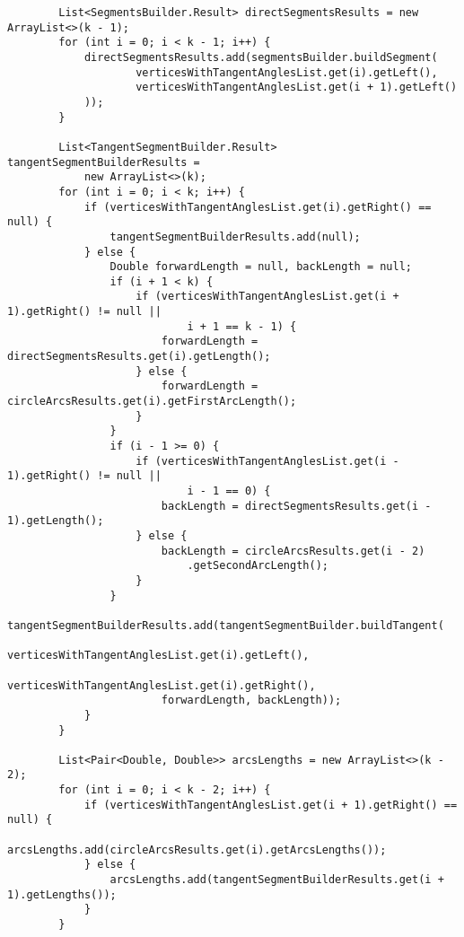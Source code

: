\begin{verbatim}
        List<SegmentsBuilder.Result> directSegmentsResults = new ArrayList<>(k - 1);
        for (int i = 0; i < k - 1; i++) {
            directSegmentsResults.add(segmentsBuilder.buildSegment(
                    verticesWithTangentAnglesList.get(i).getLeft(),
                    verticesWithTangentAnglesList.get(i + 1).getLeft()
            ));
        }

        List<TangentSegmentBuilder.Result> tangentSegmentBuilderResults =
            new ArrayList<>(k);
        for (int i = 0; i < k; i++) {
            if (verticesWithTangentAnglesList.get(i).getRight() == null) {
                tangentSegmentBuilderResults.add(null);
            } else {
                Double forwardLength = null, backLength = null;
                if (i + 1 < k) {
                    if (verticesWithTangentAnglesList.get(i + 1).getRight() != null ||
                            i + 1 == k - 1) {
                        forwardLength = directSegmentsResults.get(i).getLength();
                    } else {
                        forwardLength = circleArcsResults.get(i).getFirstArcLength();
                    }
                }
                if (i - 1 >= 0) {
                    if (verticesWithTangentAnglesList.get(i - 1).getRight() != null ||
                            i - 1 == 0) {
                        backLength = directSegmentsResults.get(i - 1).getLength();
                    } else {
                        backLength = circleArcsResults.get(i - 2)
                            .getSecondArcLength();
                    }
                }
                tangentSegmentBuilderResults.add(tangentSegmentBuilder.buildTangent(
                        verticesWithTangentAnglesList.get(i).getLeft(),
                        verticesWithTangentAnglesList.get(i).getRight(),
                        forwardLength, backLength));
            }
        }

        List<Pair<Double, Double>> arcsLengths = new ArrayList<>(k - 2);
        for (int i = 0; i < k - 2; i++) {
            if (verticesWithTangentAnglesList.get(i + 1).getRight() == null) {
                arcsLengths.add(circleArcsResults.get(i).getArcsLengths());
            } else {
                arcsLengths.add(tangentSegmentBuilderResults.get(i + 1).getLengths());
            }
        }


\end{verbatim}
